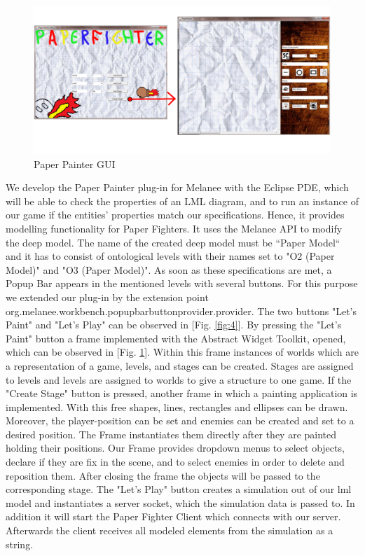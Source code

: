 \begin{figure}
	\centering
	\includegraphics[scale=0.2]{grafiken/PaperPainter.png}
	\caption{Paper Painter GUI}
	\label{fig:5}
\end{figure}
We develop the Paper Painter plug-in for Melanee with the Eclipse PDE, which will be able to check the properties of an LML diagram, and to run an instance of our game if the entities' properties match our specifications. Hence, it provides modelling functionality for Paper Fighters. It uses the Melanee API to modify the deep model. The name of the created deep model must be “Paper Model“ and it has to consist of ontological levels with their names set to "O2 (Paper Model)" and "O3 (Paper Model)". As soon as these specifications are met, a Popup Bar appears in the mentioned levels with several buttons. For this purpose we extended our plug-in by the extension point org.melanee.workbench.popupbarbuttonprovider.provider. The two buttons "Let's Paint" and "Let's Play" can be observed in [Fig. \ref{fig:4}]. By pressing the "Let's Paint" button a frame implemented with the Abstract Widget Toolkit, opened, which can be observed in [Fig. \ref{fig:5}]. Within this frame instances of worlds which are a representation of a game, levels, and stages can be created. Stages are assigned to levels and levels are assigned to worlds to give a structure to one game. If the "Create Stage" button is pressed, another frame in which a painting application is implemented. With this free shapes, lines, rectangles and ellipses can be drawn. Moreover, the player-position can be set and enemies can be created and set to a desired position. The Frame instantiates them directly after they are painted holding their positions. Our Frame provides dropdown menus to select objects, declare if they are fix in the scene, and to select enemies in order to delete and reposition them. After closing the frame the objects will be passed to the corresponding stage. The "Let's Play" button creates a simulation out of our lml model and instantiates a server socket, which the simulation data is passed to. In addition it will start the Paper Fighter Client which connects with our server. Afterwards the client receives all modeled elements from the simulation as a string.
